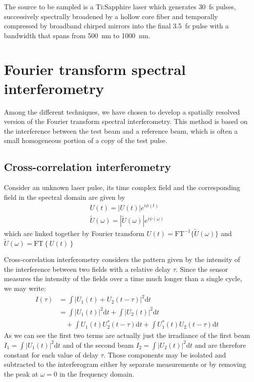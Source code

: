 \documentclass[12pt,a4paper,twoside]{article}
\begin{document}
The source to be sampled is a Ti:Sapphire laser which generates \SI{30}{\fs} pulses, successively spectrally broadened by a hollow core fiber and temporally compressed by broadband chirped mirrors into the final \SI{3.5}{\fs} pulse with a bandwidth that spans from \SI{500}{\nm} to \SI{1000}{\nm}.

\clearpage
\section{Fourier transform spectral interferometry}
Among the different techniques, we have chosen to develop a spatially resolved version of the Fourier transform spectral interferometry.
This method is based on the interference between the test beam and a reference beam, which is often a small homogeneous portion of a copy of the test pulse.

\subsection{Cross-correlation interferometry}
Consider an unknown laser pulse, its time complex field and the corresponding field in the spectral domain are given by
\begin{gather}
	U(t) = |U(t)|e^{i\phi(t)} \\
	\tilde{U}(\omega) = |\tilde{U}(\omega)|e^{i\psi(\omega)}
	\label{eq_def}
\end{gather}
which are linked together by Fourier transform $U(t) = \mathrm{FT}^{-1} \lbrace \tilde{U}(\omega) \rbrace$ and $\tilde{U}(\omega) = \mathrm{FT} \left\lbrace U(t) \right\rbrace$

Cross-correlation interferometry considers the pattern given by the intensity of the interference between two fields with a relative delay $\tau$.
Since the sensor measures the intensity of the fields over a time much longer than a single cycle, we may write:
\begin{align}
	I(\tau) 	&= \int|U_1(t)+U_2(t-\tau)|^2\mathrm{d}t \nonumber\\
			&= \int|U_1(t)|^2\mathrm{d}t + \int|U_2(t)|^2\mathrm{d}t \nonumber\\
			&\quad + \int U_1(t)U_2^*(t-\tau)\mathrm{d}t + \int U_1^*(t)U_2(t-\tau)\mathrm{d}t 
	\label{eq_xcorr}
\end{align}
As we can see the first two terms are actually just the irradiance of the first beam $I_1 = \int|U_1(t)|^2\mathrm{d}t$ and of the second beam $I_2 = \int|U_2(t)|^2\mathrm{d}t$ and are therefore constant for each value of delay $\tau$.
Those components may be isolated and subtracted to the interferogram either by separate measurements or by removing the peak at $\omega = 0$ in the frequency domain.
\end{document}
